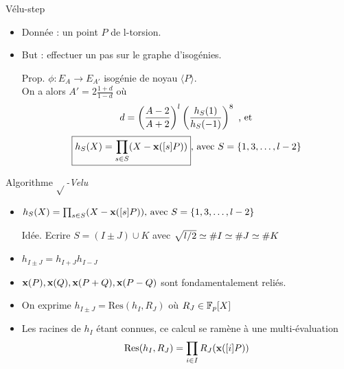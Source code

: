 \documentclass{beamer}
\begin{document}
\begin{frame}[fragile]{Vélu-step}
\begin{itemize}
	\item Donnée : un point $P$ de l-torsion.
	\item But : effectuer un pas sur le graphe d'isogénies.
	\item[Prop.]{$\phi:E_A\rightarrow E_{A'}$ isogénie de noyau $\langle P \rangle$.\\
		On a alors $\boxed{A'=2\frac{1+d}{1-d}}$ où\\
		\[d = \left(\frac{A-2}{A+2}\right)^{\mathnormal{l}} \left( \frac{h_S(1)}{h_S(-1)}\right)^8 \text{ , et}\]
			\[\boxed{h_S(X) = \prod_{s\in S}(X-\textbf{x}([s]P))}\text{, avec }S=\{1,3, \ldots, \mathnormal{l}-2\}\]}
\end{itemize}
\end{frame}

\begin{frame}[fragile]{Algorithme $\sqrt{}$\textit{-Velu}}
	\begin{itemize}
		\item{$h_S(X) = \prod_{s\in S}(X-\textbf{x}([s]P))\text{, avec }S=\{1,3, \ldots, \mathnormal{l}-2\}$}
		\item[Idée.] {Ecrire $S=(I\pm J) \cup K$} avec $\sqrt{\mathnormal{l}/2}\simeq \#I \simeq \#J \simeq \#K$
		\item{$h_{I\pm J} = h_{I+J} h_{I-J}$}
		\item{$\textbf{x}(P), \textbf{x}(Q), \textbf{x}(P+Q), \textbf{x}(P-Q)$ sont fondamentalement reliés.}
		\item{On exprime $h_{I\pm J}=\text{Res}(h_I, R_J)$ où $R_J\in\mathbb{F}_p[X]$}
		\item{Les racines de $h_I$ étant connues, ce calcul se ramène à une multi-évaluation
			\[\text{Res}(h_I, R_J)=\prod_{i\in I}R_J(\textbf{x}([i]P))\]}
	\end{itemize}$\begin{array}{rcccl}
\end{array}$
\end{frame}
\end{document}
